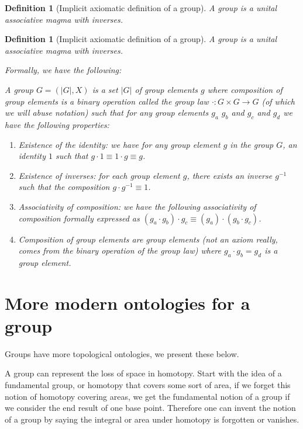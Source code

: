 \documentclass{tufte-book}
\newtheorem{definition}[theorem]{Definition}
\begin{document}
\begin{definition}[Implicit axiomatic definition of a group]
  A group is a unital associative magma with inverses.
\end{definition}

\begin{definition}[Implicit axiomatic definition of a group]
  A group is a unital associative magma with inverses.

  Formally, we have the following:

  A group $G = (|G|, X)$ is a set $|G|$ 
  of group elements $g$
  where composition of group elements is a
  binary operation called the group law $\cdot: G \times G \rightarrow G$ (of which we will abuse notation)
  such that for any group elements $g_a$ $g_b$ and $g_c$ and $g_d$ we have the following properties:
  
  \begin{enumerate}
	\item Existence of the identity: we have for any group element $g$ in the group $G$, an identity $1$ such that $g \cdot 1 \equiv 1 \cdot g \equiv g$.
	\item Existence of inverses: for each group element $g$, there exists an inverse $g^{-1}$ such that the composition $g \cdot g^{-1} \equiv 1$.
	\item Associativity of composition: we have the following associativity of composition formally expressed as $(g_a \cdot g_b) \cdot g_c \equiv (g_a) \cdot (g_b \cdot g_c)$.
	\item Composition of group elements are group elements (not an axiom really, comes from the binary operation of the group law) where $g_a \cdot g_b = g_d$ is a group element.
  \end{enumerate}
\end{definition}

\section{More modern ontologies for a group}

Groups have more topological ontologies, we present these below.

A group can represent the loss of space in homotopy. Start with the idea of a fundamental group, or homotopy that covers some sort of area, if we forget this notion of homotopy covering areas, we get the fundamental notion of a group if we consider the end result of one base point. Therefore one can invent the notion of a group by saying the integral or area under homotopy is forgotten or vanishes.
\end{document}
